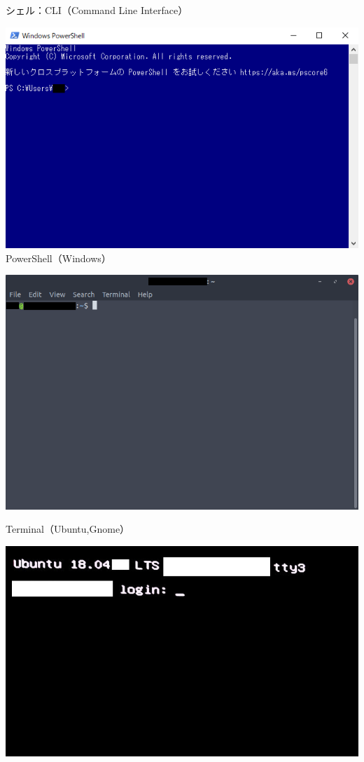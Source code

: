 \documentclass[12pt,aspectratio=169]{beamer}
\begin{document}
\begin{frame}{シェル：CLI（Command Line Interface）}
\begin{minipage}{0.3\textwidth}
    \includegraphics[width=1.2\linewidth,bb=0 0 620 388]{./images/powershell.png}
    PowerShell（Windows）
  \end{minipage}
  \hfill
  \begin{minipage}{0.3\textwidth}
    \includegraphics[width=\linewidth,bb=0 0 734 487]{./images/ubuntu-gnome.png}
    \begin{flushleft} \small Terminal（Ubuntu,Gnome） \end{flushleft}
    \includegraphics[width=\linewidth,bb=0 0 734 487]{./images/ubuntu-cli.jpg}

\end{minipage}
\end{frame}
\end{document}

